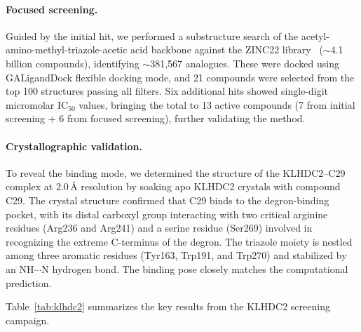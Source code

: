 \documentclass[11pt]{article}
\begin{document}
\paragraph{Focused screening.} Guided by the initial hit, we performed a substructure search of the acetyl-amino-methyl-triazole-acetic acid backbone against the ZINC22 library~\citep{tingle2023zinc22} (${\sim}$4.1 billion compounds), identifying ${\sim}$381,567 analogues. These were docked using GALigandDock flexible docking mode, and 21 compounds were selected from the top 100 structures passing all filters. Six additional hits showed single-digit micromolar IC$_{50}$ values, bringing the total to 13 active compounds (7 from initial screening + 6 from focused screening), further validating the method.

\paragraph{Crystallographic validation.} To reveal the binding mode, we determined the structure of the KLHDC2--C29 complex at 2.0\,\AA{} resolution by soaking apo KLHDC2 crystals with compound C29. The crystal structure confirmed that C29 binds to the degron-binding pocket, with its distal carboxyl group interacting with two critical arginine residues (Arg236 and Arg241) and a serine residue (Ser269) involved in recognizing the extreme C-terminus of the degron. The triazole moiety is nestled among three aromatic residues (Tyr163, Trp191, and Trp270) and stabilized by an NH$\cdots$N hydrogen bond. The binding pose closely matches the computational prediction.

Table~\ref{tab:klhdc2} summarizes the key results from the KLHDC2 screening campaign.
\end{document}
